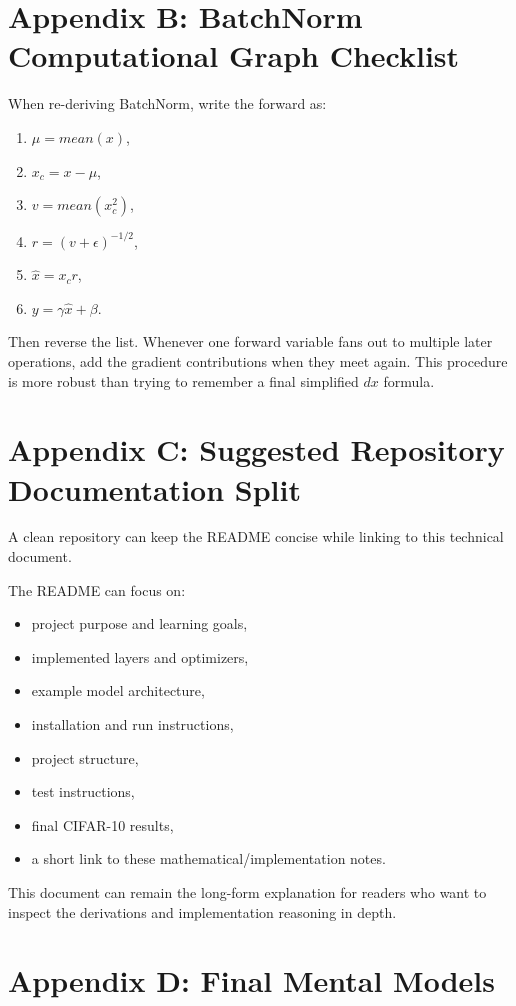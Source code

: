 \documentclass[11pt,a4paper]{article}
\begin{document}
\section{Appendix B: BatchNorm Computational Graph Checklist}

When re-deriving BatchNorm, write the forward as:
\begin{enumerate}[leftmargin=2em]
    \item $\mu=mean(x)$,
    \item $x_c=x-\mu$,
    \item $v=mean(x_c^2)$,
    \item $r=(v+\epsilon)^{-1/2}$,
    \item $\hat{x}=x_cr$,
    \item $y=\gamma\hat{x}+\beta$.
\end{enumerate}
Then reverse the list. Whenever one forward variable fans out to multiple later operations, add the gradient contributions when they meet again. This procedure is more robust than trying to remember a final simplified $dx$ formula.

\section{Appendix C: Suggested Repository Documentation Split}

A clean repository can keep the README concise while linking to this technical document.

The README can focus on:
\begin{itemize}
    \item project purpose and learning goals,
    \item implemented layers and optimizers,
    \item example model architecture,
    \item installation and run instructions,
    \item project structure,
    \item test instructions,
    \item final CIFAR-10 results,
    \item a short link to these mathematical/implementation notes.
\end{itemize}

This document can remain the long-form explanation for readers who want to inspect the derivations and implementation reasoning in depth.

\section{Appendix D: Final Mental Models}
\end{document}
